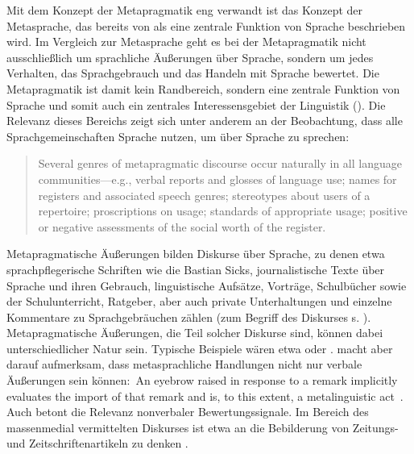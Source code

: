 Mit dem Konzept der Metapragmatik eng verwandt ist das Konzept der Metasprache, das bereits von \citet[]{Jakobson.1960} als eine zentrale Funktion von Sprache beschrieben wird. 
Im Vergleich zur Metasprache  geht es bei der Metapragmatik nicht ausschließlich um sprachliche Äußerungen über Sprache, sondern um jedes Verhalten, das Sprachgebrauch und das Handeln mit Sprache bewertet.
Die Metapragmatik ist damit kein Randbereich, sondern eine zentrale Funktion von Sprache und somit auch ein zentrales Interessensgebiet der Linguistik (\cites[s.][1--2]{Cameron1995}[3]{Jaworski.2004}[113]{Gal.2016}). 
Die Relevanz dieses Bereichs zeigt sich unter anderem an der Beobachtung, dass alle Sprachgemeinschaften Sprache nutzen, um über Sprache zu sprechen: 
\begin{quote}Several genres of metapragmatic discourse occur naturally in all language communities---e.g., verbal reports and glosses of language use; names for registers and associated speech genres; stereotypes about users of a repertoire; proscriptions on usage; standards of appropriate usage; positive or negative assessments of the social worth of the register.~\citep[][217]{Agha.1999}\end{quote}
Metapragmatische Äußerungen bilden Diskurse über Sprache, zu denen etwa sprachpflegerische Schriften wie die Bastian Sicks, journalistische Texte über Sprache und ihren Gebrauch, linguistische Aufsätze, Vorträge, Schulbücher sowie der Schulunterricht, Ratgeber, aber auch private Unterhaltungen und einzelne Kommentare zu Sprachgebräuchen zählen (zum Begriff des Diskurses s. \citealp{Foucault.1974}). 
Metapragmatische Äußerungen, die Teil solcher Diskurse sind, können dabei unterschiedlicher Natur sein. 
Typische Beispiele wären etwa  oder . 
\citeauthor{Agha2007} macht aber darauf aufmerksam, dass metasprachliche Handlungen nicht nur verbale {\"A}u{\ss}erungen sein k{\"o}nnen:~{\glqq}An eyebrow raised in response to a remark implicitly evaluates the import of that remark and is, to this extent, a metalinguistic act{\grqq}~\citep[17]{Agha2007}. 
Auch \citet[21]{Konig.2017} betont die Relevanz nonverbaler Bewertungssignale. 
Im Bereich des massenmedial vermittelten Diskurses ist etwa an die Bebilderung von Zeitungs- und Zeitschriftenartikeln zu denken \citep[s.][]{Spitzmuller.2007}. 

